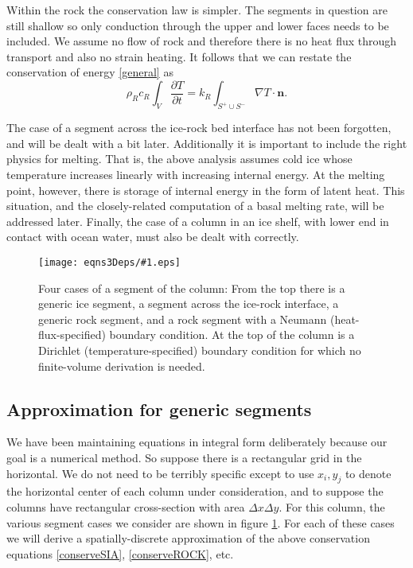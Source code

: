 \documentclass[12pt,final]{amsart}%
\theoremstyle{plain}
\theoremstyle{definition}
\theoremstyle{remark}
\newcommand{\regfigure}[2]{\texttt{[image: eqns3Deps/\#1.eps]}}
\newcommand{\ddt}[1]{\ensuremath{\frac{\partial #1}{\partial t}}}
\newcommand{\grad}{\nabla}
\newcommand{\nhat}{\mathbf{n}}
\begin{document}
Within the rock the conservation law is simpler.  The segments in question are still shallow so only conduction through the upper and lower faces needs to be included.  We assume no flow of rock and therefore there is no heat flux through transport and also no strain heating.  It follows that we can restate the conservation of energy \eqref{general} as
\begin{equation}\label{conserveROCK}
\rho_R c_R \int_V \ddt{T} = k_R \int_{S^+ \cup S^-} \grad T \cdot \nhat.
\end{equation}

The case of a segment across the ice-rock bed interface has not been forgotten, and will be dealt with a bit later.  Additionally it is important to include the right physics for melting.  That is, the above analysis assumes cold ice whose temperature increases linearly with increasing internal energy.  At the melting point, however, there is storage of internal energy in the form of latent heat.  This situation, and the closely-related computation of a basal melting rate, will be addressed later.  Finally, the case of a column in an ice shelf, with lower end in contact with ocean water, must also be dealt with correctly.

\begin{figure}[ht]
\vspace{0.2in}
\regfigure{fourcases}{4.0}
\vspace{0.1in}
\caption{Four cases of a segment of the column: From the top there is a generic ice segment, a segment across the ice-rock interface, a generic rock segment, and a rock segment with a Neumann (heat-flux-specified) boundary condition.  At the top of the column is a Dirichlet (temperature-specified) boundary condition for which no finite-volume derivation is needed.}
\label{fig:segments}
\end{figure}


\subsection*{Approximation for generic segments}  We have been maintaining equations in integral form deliberately because our goal is a numerical method.  So suppose there is a rectangular grid in the horizontal.  We do not need to be terribly specific except to use $x_i,y_j$ to denote the horizontal center of each column under consideration, and to suppose the columns have rectangular cross-section with area $\Delta x\Delta y$.  For this column, the various segment cases we consider are shown in figure \ref{fig:segments}.  For each of these cases we will derive a spatially-discrete approximation of the above conservation equations \eqref{conserveSIA}, \eqref{conserveROCK}, etc.
\end{document}
